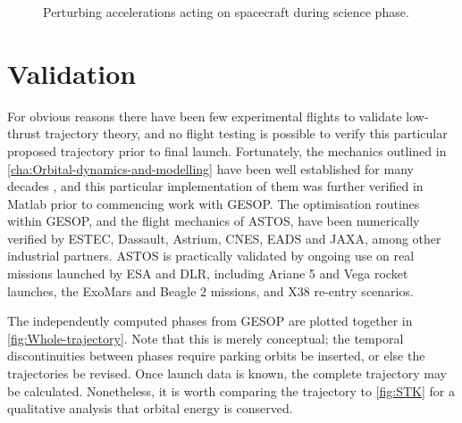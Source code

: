 \begin{figure}
\centering
\def\svgwidth{\figurewidth}

\caption{Perturbing accelerations acting on spacecraft during science phase.} \label{fig:Science-pert}
\end{figure}

%


\clearpage


\section{Validation} \label{sec:Validation}
For obvious reasons there have been few experimental flights to validate low-thrust trajectory theory, and no flight testing is possible to verify this particular proposed trajectory prior to final launch. Fortunately, the mechanics outlined in \autoref{cha:Orbital-dynamics-and-modelling} have been well established for many decades \parencite{Kaplan1976}, and this particular implementation of them was further verified in Matlab prior to commencing work with GESOP. The optimisation routines within GESOP, and the flight mechanics of ASTOS, have been numerically verified by ESTEC, Dassault, Astrium, CNES, EADS and JAXA, among other industrial partners. ASTOS is practically validated by ongoing use on real missions launched by ESA and DLR, including Ariane 5 and Vega rocket launches, the ExoMars and Beagle 2 missions, and X38 re-entry scenarios.

The independently computed phases from GESOP are plotted together in \autoref{fig:Whole-trajectory}. Note that this is merely conceptual; the temporal discontinuities between phases require parking orbits be inserted, or else the trajectories be revised. Once launch data is known, the complete trajectory may be calculated. Nonetheless, it is worth comparing the trajectory to \autoref{fig:STK} for a qualitative analysis that orbital energy is conserved.

